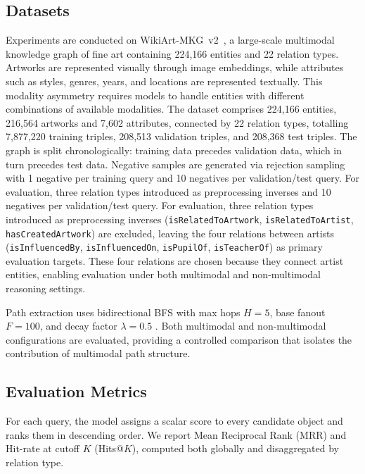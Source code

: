 \documentclass[runningheads]{llncs}
\begin{document}
\subsection{Datasets}
\label{sec:datasets}

Experiments are conducted on WikiArt-MKG~v2~\cite{efthymiou2026vlkge},
a large-scale multimodal knowledge graph of fine art containing
224,166 entities and 22 relation types. Artworks are represented
visually through image embeddings, while attributes such as styles,
genres, years, and locations are represented textually. This modality
asymmetry requires models to handle entities with different
combinations of available modalities. The dataset comprises 224,166
entities, 216,564 artworks and 7,602 attributes, connected by 22
relation types, totalling 7,877,220 training triples, 208,513
validation triples, and 208,368 test triples. The graph is split
chronologically: training data precedes validation data, which in
turn precedes test data. Negative samples are generated via rejection
sampling with 1 negative per training query and 10 negatives per
validation/test query. For evaluation, three relation types
introduced as preprocessing inverses
and 10 negatives per validation/test query. For evaluation, three
relation types introduced as preprocessing inverses
(\texttt{isRelatedToArtwork}, \texttt{isRelatedToArtist},
\texttt{hasCreatedArtwork}) are excluded, leaving the four
relations between artists (\texttt{isInfluencedBy},
\texttt{isInfluencedOn}, \texttt{isPupilOf}, \texttt{isTeacherOf})
as primary evaluation targets. These four relations are chosen
because they connect artist entities, enabling evaluation under both
multimodal and non-multimodal reasoning settings.

Path extraction uses bidirectional BFS with max hops $H = 5$, base
fanout $F = 100$, and decay factor $\lambda = 0.5$
\cite{icaart26}. Both multimodal and non-multimodal configurations are evaluated, providing a controlled comparison that isolates the contribution of multimodal path structure.

\subsection{Evaluation Metrics}
\label{sec:evaluation-metrics}

For each query, the model assigns a scalar score to every candidate
object and ranks them in descending order. We report Mean Reciprocal
Rank (MRR) and Hit-rate at cutoff $K$ (Hits@$K$), computed both
globally and disaggregated by relation type.
\end{document}
